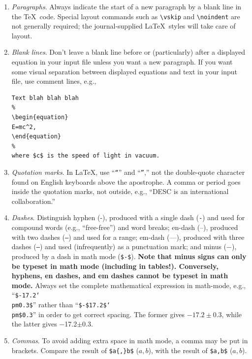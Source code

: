 \documentclass[letterpaper,11pt]{article}
\begin{document}
\begin{enumerate}

\item {\it Paragraphs\/}.
Always indicate the start of a new paragraph by a blank line in the
\TeX\ code.  Special layout commands such as \verb|\vskip| and \verb|\noindent| are not
generally  required; the journal-supplied La\TeX\ styles will take care of
layout.

\item {\it Blank lines\/}. Don't leave a blank line before or
(particularly) after a displayed equation
in your input file unless you want a new paragraph.  If you want some visual
separation between displayed equations and text in your input file, use comment
lines, e.g.,

\begin{verbatim}
Text blah blah blah
%
\begin{equation}
E=mc^2,
\end{equation}
%
where $c$ is the speed of light in vacuum.
\end{verbatim}

\item {\it Quotation marks\/}. In LaTeX, use ``{\tt``}'' and ``{\tt''},'' not the
double-quote character found on English keyboards above the apostrophe.
A comma or period goes inside the quotation marks, not outside, e.g.,
``DESC is an international collaboration.''

\item {\it Dashes\/}. Distinguish hyphen (-), produced with a single dash
({\tt -}) and used for compound words (e.g., ``free-free'') and word breaks;
en-dash (--), produced with two dashes ({\tt --}) and used for a range;
em-dash (---), produced with three dashes ({\tt ---}) and used (infrequently)
as a punctuation mark; and minus ($-$), produced by a dash in math mode
({\tt \$-\$}). {\bf Note that minus signs can only be typeset in math mode
(including in tables!).  Conversely, hyphens, en dashes, and em dashes cannot
be typeset in math mode.}  Always set the complete mathematical expression in
math-mode, e.g., ``{\tt\$-17.2\char`\\pm0.3\$}'' rather than
``{\tt\$-\$17.2\$\char`\\pm\$0.3}'' in order to get correct spacing.  The
former gives $-17.2\pm0.3$, while the latter gives $-$17.2$\pm$0.3.

\item {\it Commas\/}. To avoid adding extra space in math mode, a comma may be
put in brackets.  Compare the result of \verb|$a{,}b$| ($a{,}b$), with the result
of \verb|$a,b$| ($a,b$).


\end{enumerate}
\end{document}
